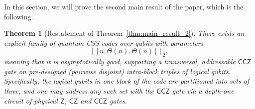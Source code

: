 \documentclass[11pt]{article}
\newtheorem{theorem}{Theorem}[section]
\theoremstyle{definition}
\newcommand{\CCZ}{\mathsf{CCZ}}
\begin{document}
In this section, we will prove the second main result of the paper, which is the following.
\begin{theorem}[Restatement of Theorem~\ref{thm:main_result_2}]\label{thm:main_asymp_good}
    There exists an explicit family of quantum CSS codes over qubits with parameters
    \begin{equation}
        \left[\left[n,\Theta(n),\Theta(n)\right]\right]_2,
    \end{equation}
    meaning that it is asymptotically good, supporting a transversal, addressable $\CCZ$ gate on pre-designed (pairwise disjoint) intra-block triples of logical qubits. Specifically, the logical qubits in one block of the code are partitioned into sets of three, and one may address any such set with the $\CCZ$ gate via a depth-one circuit of physical $\mathsf{Z}$, $\mathsf{CZ}$ and $\mathsf{CCZ}$ gates.
\end{theorem}
\end{document}
